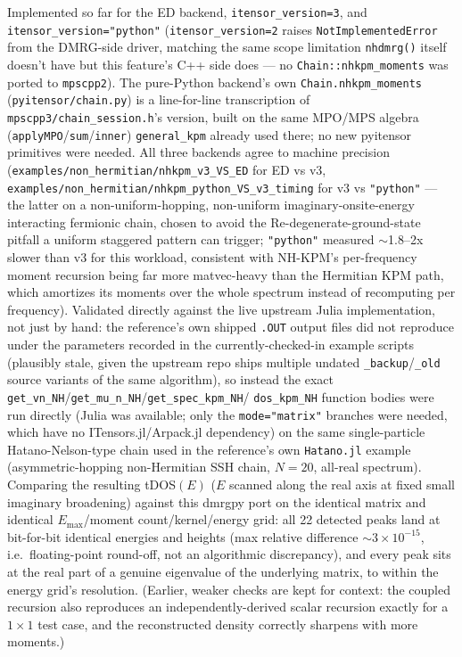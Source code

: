 \documentclass[11pt]{article}
\begin{document}
Implemented so far for the ED backend, \texttt{itensor\_version=3}, and
\texttt{itensor\_version="python"} (\texttt{itensor\_version=2} raises
\texttt{NotImplementedError} from the DMRG-side driver, matching the
same scope limitation \texttt{nhdmrg()} itself doesn't have but this
feature's C++ side does --- no \texttt{Chain::nhkpm\_moments} was
ported to \texttt{mpscpp2}). The pure-Python backend's own
\texttt{Chain.nhkpm\_moments} (\texttt{pyitensor/chain.py}) is a
line-for-line transcription of \texttt{mpscpp3/chain\_session.h}'s
version, built on the same MPO/MPS algebra
(\texttt{applyMPO}/\texttt{sum}/\texttt{inner}) \texttt{general\_kpm}
already used there; no new pyitensor primitives were needed. All three
backends agree to machine precision
(\texttt{examples/non\_hermitian/nhkpm\_v3\_VS\_ED} for ED vs v3,
\texttt{examples/non\_hermitian/nhkpm\_python\_VS\_v3\_timing} for v3
vs \texttt{"python"} --- the latter on a non-uniform-hopping,
non-uniform imaginary-onsite-energy interacting fermionic chain, chosen
to avoid the Re-degenerate-ground-state pitfall a uniform staggered
pattern can trigger; \texttt{"python"} measured $\sim$1.8--2x slower
than v3 for this workload, consistent with NH-KPM's per-frequency
moment recursion being far more matvec-heavy than the Hermitian KPM
path, which amortizes its moments over the whole spectrum instead of
recomputing per frequency). Validated directly against the live
upstream Julia implementation, not just by hand: the reference's own
shipped \texttt{.OUT} output files did not reproduce under the
parameters recorded in the currently-checked-in example scripts
(plausibly stale, given the upstream repo ships multiple undated
\texttt{\_backup}/\texttt{\_old} source variants of the same
algorithm), so instead the exact
\texttt{get\_vn\_NH}/\texttt{get\_mu\_n\_NH}/\texttt{get\_spec\_kpm\_NH}/
\texttt{dos\_kpm\_NH} function bodies were run directly (Julia was
available; only the \texttt{mode="matrix"} branches were needed, which
have no ITensors.jl/Arpack.jl dependency) on the same single-particle
Hatano-Nelson-type chain used in the reference's own
\texttt{Hatano.jl} example (asymmetric-hopping non-Hermitian SSH chain,
$N=20$, all-real spectrum). Comparing the resulting tDOS$(E)$ ($E$
scanned along the real axis at fixed small imaginary broadening)
against this dmrgpy port on the identical matrix and identical
$E_{\max}$/moment count/kernel/energy grid: all 22 detected peaks land
at bit-for-bit identical energies and heights (max relative difference
$\sim3\times10^{-15}$, i.e.\ floating-point round-off, not an
algorithmic discrepancy), and every peak sits at the real part of a
genuine eigenvalue of the underlying matrix, to within the energy
grid's resolution. (Earlier, weaker checks are kept for context: the
coupled recursion also reproduces an independently-derived scalar
recursion exactly for a $1\times1$ test case, and the reconstructed
density correctly sharpens with more moments.)
\end{document}
